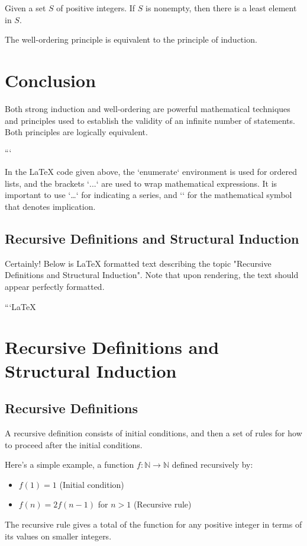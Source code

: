 Given a set $S$ of positive integers. If $S$ is nonempty, then there is a least element in $S$.

\noindent The well-ordering principle is equivalent to the principle of induction.

\section{Conclusion}
Both strong induction and well-ordering are powerful mathematical techniques and principles used to establish the validity of an infinite number of statements. Both principles are logically equivalent.


```

In the LaTeX code given above, the `enumerate` environment is used for ordered lists, and the brackets `$...$` are used to wrap mathematical expressions. It is important to use `\ldots` for indicating a series, and `\Rightarrow` for the mathematical symbol that denotes implication.

\subsection{Recursive Definitions and Structural Induction}
Certainly! Below is LaTeX formatted text describing the topic "Recursive Definitions and Structural Induction". Note that upon rendering, the text should appear perfectly formatted.

```LaTeX
\section{Recursive Definitions and Structural Induction}
\subsection{Recursive Definitions}
A recursive definition consists of initial conditions, and then a set of rules for how to proceed after the initial conditions. 

Here's a simple example, a function $f: \mathbb{N} \rightarrow \mathbb{N}$ defined recursively by:
\begin{itemize}
    \item $f(1) = 1$ (Initial condition)
    \item $f(n) = 2f(n-1)$ for $n>1$ (Recursive rule)
\end{itemize}

The recursive rule gives a total of the function for any positive integer in terms of its values on smaller integers.

